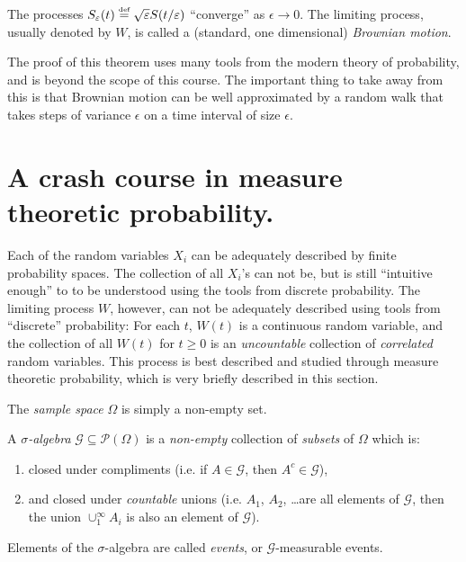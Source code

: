 \begin{theorem}\label{t:SRW}
  The processes $S_\varepsilon(t) \stackrel{\scriptscriptstyle\textup{def}}{=} \sqrt{\varepsilon} S( t / \varepsilon )$ ``converge'' as $\epsilon \to 0$.
  The limiting process, usually denoted by $W$, is called a (standard, one dimensional) \emph{Brownian motion}.
\end{theorem}

The proof of this theorem uses many tools from the modern theory of probability, and is beyond the scope of this course.
The important thing to take away from this is that Brownian motion can be well approximated by a random walk that takes steps of variance $\epsilon$ on a time interval of size $\epsilon$.
 

\section{A crash course in measure theoretic probability.}

Each of the random variables $X_i$ can be adequately described by finite probability spaces.
The collection of all $X_i$'s can not be, but is still ``intuitive enough'' to to be understood using the tools from discrete probability.
The limiting process $W$, however, can not be adequately described using tools from ``discrete'' probability: For each $t$, $W(t)$ is a continuous random variable, and the collection of all $W(t)$ for $t \geq 0$ is an \emph{uncountable} collection of \emph{correlated} random variables.
This process is best described and studied through measure theoretic probability, which is very briefly described in this section.

\begin{definition}
  The \emph{sample space} $\Omega$ is simply a non-empty set.
\end{definition}

\begin{definition}
  A \emph{$\sigma$-algebra} $\mathcal G \subseteq \mathcal P(\Omega)$ is a \emph{non-empty} collection of \emph{subsets} of $\Omega$ which is:
  \begin{enumerate}
    \item closed under compliments (i.e. if $A \in \mathcal G$, then $A^c \in \mathcal G$),
    \item and closed under \emph{countable} unions (i.e. $A_1$, $A_2$, \dots are all elements of $\mathcal G$, then the union $\cup_1^\infty A_i$ is also an element of $\mathcal G$).
  \end{enumerate}
  Elements of the $\sigma$-algebra are called \emph{events}, or $\mathcal G$-measurable events.
\end{definition}

